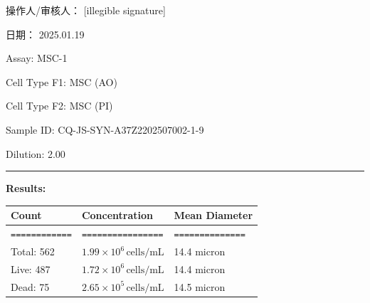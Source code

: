 \documentclass[UTF8,10pt,a4paper,fontset=fandol]{ctexart}
\newcommand{\fieldvalue}[1]{#1}
\newcommand{\handwritten}[1]{#1}
\begin{document}
\begin{center}
\begin{center}
\vfill

\noindent
操作人/审核人：
\fieldvalue{\handwritten{[illegible signature]}}

\hfill
日期：
\fieldvalue{\handwritten{2025.01.19}}

\newpage

Assay:
\fieldvalue{MSC-1}

Cell Type F1:
\fieldvalue{MSC (AO)}

Cell Type F2:
\fieldvalue{MSC (PI)}

Sample ID:
\fieldvalue{CQ-JS-SYN-A37Z2202507002-1-9}

Dilution:
\fieldvalue{2.00}

\noindent\rule{\textwidth}{0.4pt}

\textbf{Results:}

\begin{tabularx}{\textwidth}{@{}XXX@{}}
\textbf{Count} & \textbf{Concentration} & \textbf{Mean Diameter} \\
\hline
\texttt{============} & \texttt{================} & \texttt{==============} \\

Total:
\fieldvalue{562}
&
\fieldvalue{\(1.99\times 10^{6}\,\mathrm{cells/mL}\)}
&
\fieldvalue{14.4 micron}
\\

Live:
\fieldvalue{487}
&
\fieldvalue{\(1.72\times 10^{6}\,\mathrm{cells/mL}\)}
&
\fieldvalue{14.4 micron}
\\

Dead:
\fieldvalue{75}
&
\fieldvalue{\(2.65\times 10^{5}\,\mathrm{cells/mL}\)}
&
\fieldvalue{14.5 micron}
\\
\end{tabularx}


\end{center}
\end{center}
\end{document}
